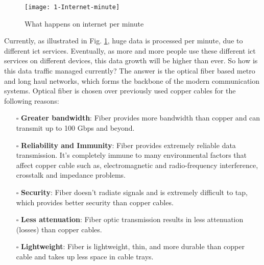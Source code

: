 \documentclass[../report.tex]{subfiles}
\begin{document}
\begin{figure}[!tbp]
	\centering
	\texttt{[image: 1-Internet-minute]}
	\caption{What happens on internet per minute \cite{internet_minute}}
	\label{fig:1_internet_minute}
\end{figure}
Currently, as illustrated in Fig. \ref{fig:1_internet_minute}, huge data is processed per minute, due to different \gls{ict} services. Eventually, as more and more people use these different \gls{ict} services on different devices, this data growth will be higher than ever. So how is this data traffic managed currently? The answer is the optical fiber based metro and long haul networks, which forms the backbone of the modern communication systems. Optical fiber is chosen over previously used copper cables for the following reasons:
\begin{itemize}
	\item[$\square$] \textbf{Greater bandwidth}: Fiber provides more bandwidth than copper and can transmit up to 100 Gbps and beyond.
	\item[$\square$] \textbf{Reliability and Immunity}: Fiber provides extremely reliable data transmission. It’s completely immune to many environmental factors that affect copper cable such as, electromagnetic and radio-frequency interference, crosstalk and impedance problems.  
	\item[$\square$] \textbf{Security}: Fiber doesn’t radiate signals and is extremely difficult to tap, which provides better security than copper cables.
	\item[$\square$] \textbf{Less attenuation}: Fiber optic transmission results in less attenuation (losses) than copper cables.
	\item[$\square$] \textbf{Lightweight}: Fiber is lightweight, thin, and more durable than copper cable and takes up less space in cable trays.
\end{itemize}
\end{document}
